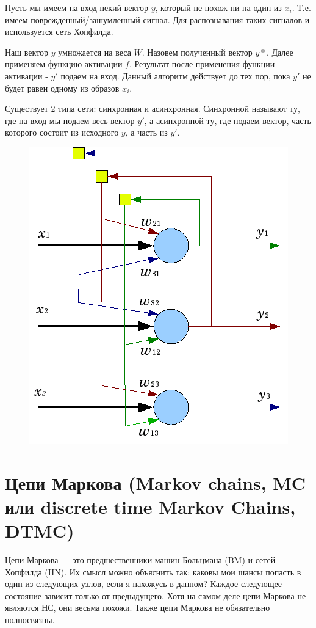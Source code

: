 \documentclass[paper=a4, fontsize=11pt]{scrartcl} %
\numberwithin{equation}{section} %
\numberwithin{figure}{section} %
\numberwithin{table}{section} %
\begin{document}
	Пусть мы имеем на вход некий вектор $y$, который не похож ни на один из $x_i$. Т.е. имеем поврежденный/зашумленный сигнал. Для распознавания таких сигналов и используется сеть Хопфилда. 
	
	Наш вектор $y$ умножается на веса $W$. Назовем полученный вектор $y*$. Далее применяем функцию активации $f$. Результат после применения функции активации - $y'$ подаем на вход. Данный алгоритм действует до тех пор, пока $y'$ не будет равен одному из образов $x_i$. 
	
	Существует 2 типа сети: синхронная и асинхронная. Синхронной называют ту, где на вход мы подаем весь вектор $y'$, а асинхронной ту, где подаем вектор, часть которого состоит из исходного $y$, а часть из $y'$.
	
	\begin{figure}[h!]
		\centering
		\includegraphics[scale=0.45]{Hopfield's_net}
	\end{figure}
	
	\section{Цепи Маркова (Markov chains, MC или discrete time Markov Chains, DTMC)}
	Цепи Маркова — это предшественники машин Больцмана (BM) и сетей Хопфилда (HN). Их смысл можно объяснить так: каковы мои шансы попасть в один из следующих узлов, если я нахожусь в данном? Каждое следующее состояние зависит только от предыдущего. Хотя на самом деле цепи Маркова не являются НС, они весьма похожи. Также цепи Маркова не обязательно полносвязны.
	
\end{document}
